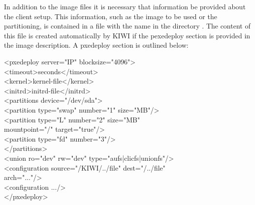 \begin{itemize}
    In addition to the image files it is necessary that information be
    provided about the client setup. This information, such as the image
    to be used or the partitioning, is contained in a file with the name
     in the directory . The content
    of this file is created automatically by KIWI if the pexedeploy section
    is provided in the image description. A pxedeploy section is outlined
    below:
	
	\begin{Command}{14cm}
	<pxedeploy server="IP" blocksize="4096">\\
	\hspace*{1cm}<timeout>seconds</timeout>\\
	\hspace*{1cm}<kernel>kernel-file</kernel>\\
	\hspace*{1cm}<initrd>initrd-file</initrd>\\
	\hspace*{1cm}<partitions device="/dev/sda">\\
	\hspace*{2cm}<partition type="swap" number="1" size="MB"/>\\
	\hspace*{2cm}<partition type="L" number="2" size="MB"\\
	\hspace*{4.5cm}mountpoint="/" target="true"/>\\
	\hspace*{2cm}<partition type="fd" number="3"/>\\
	\hspace*{1cm}</partitions>\\
	\hspace*{1cm}<union ro="dev" rw="dev" type="aufs|clicfs|unionfs"/>\\
	\hspace*{1cm}<configuration source="/KIWI/../file" dest="/../file"\\
	\hspace*{4.5cm}arch="..."/>\\
	\hspace*{1cm}<configuration .../>\\
	</pxedeploy>
	\end{Command}


\end{itemize}
